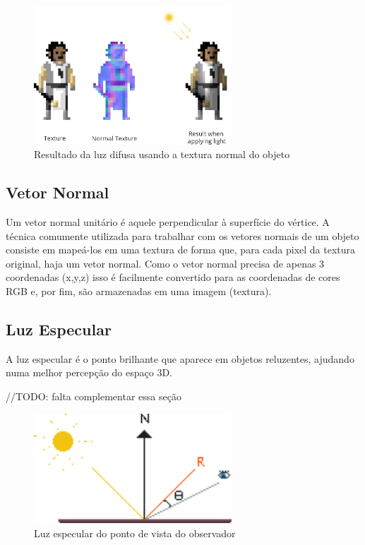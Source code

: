 \documentclass[12pt, 
openright, 
oneside, 
a4paper,    
brazil]{facom-ufu-abntex2}
\begin{document}
\begin{figure}[H]
	\centering
	\includegraphics[width=20em]{imagens/normalTextureExample.png}
	\caption{Resultado da luz difusa usando a textura normal do objeto}
\end{figure}

\subsection{Vetor Normal}

Um vetor normal unitário é aquele perpendicular à superfície do vértice. A técnica comumente utilizada para trabalhar com os vetores normais de um objeto consiste em mapeá-los em uma textura de forma que, para cada pixel da textura original, haja um vetor normal. Como o vetor normal precisa de apenas 3 coordenadas (x,y,z) isso é facilmente convertido para as coordenadas de cores RGB e, por fim, são armazenadas em uma imagem (textura).

\subsection{Luz Especular}
A luz especular é o ponto brilhante que aparece em objetos reluzentes, ajudando numa melhor percepção do espaço 3D. %

//TODO: falta complementar essa seção

\begin{figure}[H]
	\centering
	\includegraphics[width=20em]{imagens/specular.png}
	\caption{Luz especular do ponto de vista do observador}
\end{figure}
\end{document}
